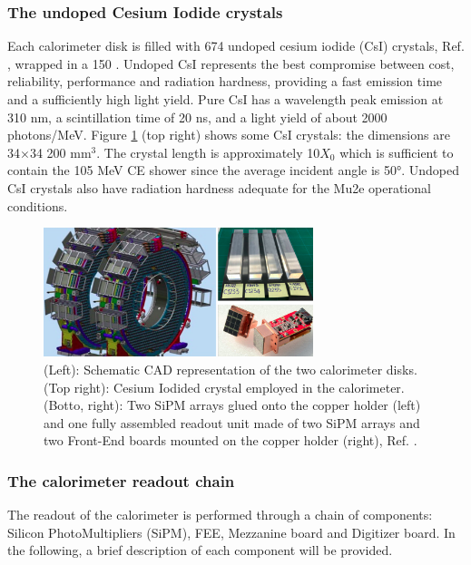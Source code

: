 \subsubsection{The undoped Cesium Iodide crystals}
Each calorimeter disk is filled with 674 undoped cesium 
iodide (CsI) crystals, Ref. \cite{em6}, wrapped in a 150  . 
Undoped CsI represents the best compromise between cost, 
reliability, performance and radiation hardness, providing 
a fast emission time and a sufficiently high light yield. Pure 
CsI has a wavelength peak emission at 310 nm,  a scintillation 
time of 20 ns, and a light yield of about 2000 photons/MeV. 
Figure \ref{fig:calo2} (top right) shows some CsI crystals: 
the dimensions are 34$\times$34 200 mm$^3$. The crystal length 
is approximately 10$X_0$ which is sufficient to contain the 105 
MeV CE shower since the average incident angle 
is 50°. Undoped CsI crystals also have  radiation hardness 
adequate for the Mu2e operational conditions. 




\begin{figure}[!h]
    \centering
    \includegraphics[width =0.7\textwidth]{figures/png/Screenshot_20240322_121000.png}
    \caption[The calorimeter components.]{(Left): Schematic CAD representation of the two calorimeter disks. (Top right): 
    Cesium Iodided crystal employed in the calorimeter. (Botto, right): Two SiPM arrays 
    glued onto the copper holder (left) and one fully assembled readout unit made of two 
    SiPM arrays and two Front-End boards mounted on the copper holder (right), Ref. \cite{em4}.}
    \label{fig:calo2}
\end{figure}


\subsubsection{The calorimeter readout chain}
The readout of the calorimeter is performed through a chain of components: Silicon PhotoMultipliers (SiPM), 
FEE, Mezzanine board and Digitizer board. In the following, 
a brief description of each component will be provided.
